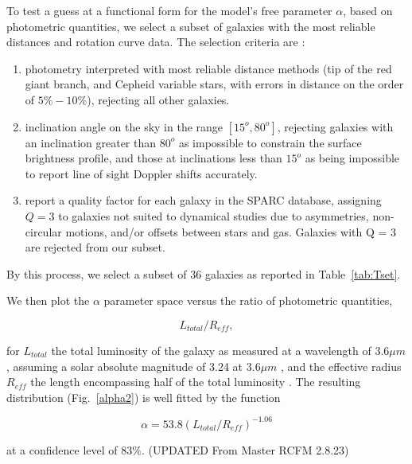 \documentclass[reprint,%
 amsmath,amssymb,
 aps,
]{revtex4-1}
\begin{document}
  To test a guess at a functional form  for the  model's free parameter $\alpha$,  based on photometric quantities, we   select a subset of galaxies with the most reliable distances and rotation curve data. 
  The selection  criteria are \cite{2016Lelli}:  
  \begin{enumerate}
      \item photometry interpreted with most reliable  distance methods    (tip of the red giant branch, and Cepheid variable stars,  with errors in distance on the order of $5\% - 10\%$), rejecting all other galaxies. \\
      \item  inclination angle on the sky  in the range  $[15^o, 80^o]$, rejecting galaxies with an inclination  greater than $80^o$ as impossible to constrain the surface brightness profile, and those at inclinations less than $15^o$ as being impossible to  report line of sight Doppler shifts accurately.\\
      \item  \citet{2016Lelli}   report a quality factor for each galaxy in the SPARC database, assigning  $Q=3$ to galaxies not suited to dynamical studies due to     asymmetries,  non-circular motions, and/or offsets between stars and gas. Galaxies with Q = 3 are rejected from our subset.
  \end{enumerate}
    By this process, we select a subset of 36 galaxies as reported in Table~\ref{tab:Tset}. 


 We then plot the  $\alpha$   parameter  space versus the ratio of  photometric quantities,  
  
\begin{equation}
    L_{total}/R_{eff}, 
\end{equation}
 
 for  $L_{total}$    the  total luminosity of the galaxy as measured  at a wavelength of $3.6 \mu m$,  assuming a solar
absolute magnitude of 3.24 at $3.6 \mu m$ \cite{oh2008high}, and the effective radius $R_{eff}$    the length encompassing half of the total luminosity \cite{2016Lelli}. 
 The resulting distribution    (Fig.~\ref{alpha2}) is  well fitted by the function 
 
    
\begin{equation}
    \alpha =  
    53.8 (L_{total}/R_{eff})^{-1.06}
       \label{FreeParamFix}
\end{equation}

at a confidence level of $83\%$.
{\color{blue}(UPDATED From Master RCFM 2.8.23)}
  
\end{document}
